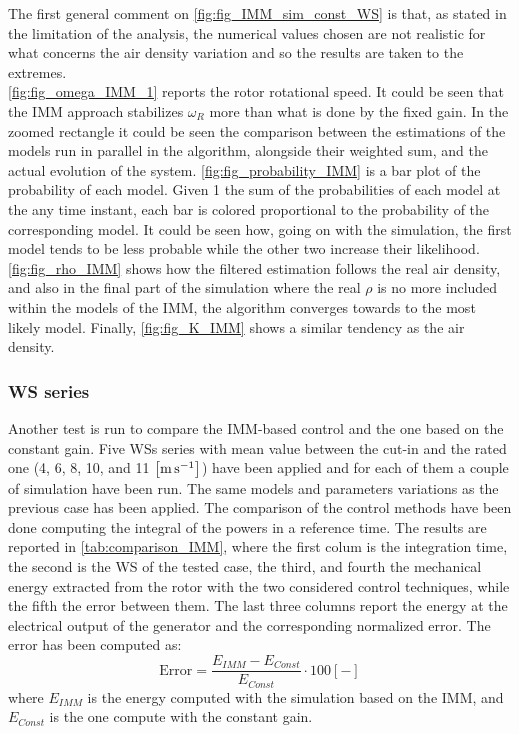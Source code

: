 The first general comment on \autoref{fig:fig_IMM_sim_const_WS} is that, as stated in the limitation of the analysis, the numerical values chosen are not realistic for what concerns the air density variation and so the results are taken to the extremes. \\
\autoref{fig:fig_omega_IMM_1} reports the rotor rotational speed. It could be seen that the IMM approach stabilizes $\omega_R$ more than what is done by the fixed gain. In the zoomed rectangle it could be seen the comparison between the estimations of the models run in parallel in the algorithm, alongside their weighted sum, and the actual evolution of the system. \autoref{fig:fig_probability_IMM} is a bar plot of the probability of each model. Given 1 the sum of the probabilities of each model at the any time instant, each bar is colored proportional to the probability of the corresponding model. It could be seen how, going on with the simulation, the first model tends to be less probable while the other two increase their likelihood. \autoref{fig:fig_rho_IMM} shows how the filtered estimation follows the real air density, and also in the final part of the simulation where the real $\rho$ is no more included within the models of the IMM, the algorithm converges towards to the most likely model. Finally, \autoref{fig:fig_K_IMM} shows a similar tendency as the air density. 

\subsubsection{WS series}
Another test is run to compare the IMM-based control and the one based on the constant gain. Five WSs series with mean value between the cut-in and the rated one (4, 6, 8, 10, and 11 $\left[\si{\meter\per\second}\right]$) have been applied and for each of them a couple of simulation have been run. The same models and parameters variations as the previous case has been applied. The comparison of the control methods have been done computing the integral of the powers in a reference time. The results are reported in \autoref{tab:comparison_IMM}, where the first colum is the integration time, the second is the WS of the tested case, the third, and fourth the mechanical energy extracted from the rotor with the two considered control techniques, while the fifth the error between them. The last three columns report the energy at the electrical output of the generator and the corresponding normalized error. The error has been computed as:
\begin{equation}
  \text{Error} = \frac{E_{IMM}-E_{Const}}{E_{Const}}\cdot 100 \left[-\right]
  \label{eq:energy_error}
\end{equation}
where $E_{IMM}$ is the energy computed with the simulation based on the IMM, and $E_{Const}$ is the one compute with the constant gain.

